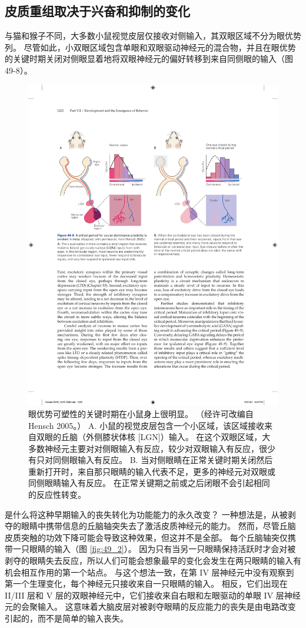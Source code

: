 \subsection{皮质重组取决于兴奋和抑制的变化}

与猫和猴子不同，大多数小鼠视觉皮层仅接收对侧输入，其双眼区域不分为眼优势列。
尽管如此，小双眼区域包含单眼和双眼驱动神经元的混合物，并且在眼优势的关键时期关闭对侧眼显着地将双眼神经元的偏好转移到来自同侧眼的输入（图 49-8）。


\begin{figure}[htbp]
	\centering
	\includegraphics[width=0.9\linewidth]{chap49/fig_49_8}
	\caption{眼优势可塑性的关键时期在小鼠身上很明显。 （经许可改编自 Hensch 2005。） A. 小鼠的视觉皮层包含一个小区域，该区域接收来自双眼的丘脑（外侧膝状体核 [LGN]）输入。 在这个双眼区域，大多数神经元主要对对侧眼输入有反应，较少对双眼输入有反应，很少有只对同侧眼输入有反应。 B. 当对侧眼睛在正常关键时期关闭然后重新打开时，来自那只眼睛的输入代表不足，更多的神经元对双眼或同侧眼睛输入有反应。 在正常关键期之前或之后闭眼不会引起相同的反应性转变。}
	\label{fig:49_8}
\end{figure}


是什么将这种早期输入的丧失转化为功能能力的永久改变？
一种想法是，从被剥夺的眼睛中携带信息的丘脑轴突失去了激活皮质神经元的能力。
然而，尽管丘脑皮质突触的功效下降可能会导致这种效果，但这并不是全部。
每个丘脑轴突仅携带一只眼睛的输入（图 \ref{fig:49_2}）。
因为只有当另一只眼睛保持活跃时才会对被剥夺的眼睛失去反应，所以人们可能会想象最早的变化会发生在两只眼睛的输入有机会相互作用的第一个站点。
与这个想法一致，在第 IV 层神经元中没有观察到第一个生理变化，每个神经元只接收来自一只眼睛的输入。
相反，它们出现在 II/III 层和 V 层的双眼神经元中，它们接收来自右眼和左眼驱动的单眼 IV 层神经元的会聚输入。
这意味着大脑皮层对被剥夺眼睛的反应能力的丧失是由电路改变引起的，而不是简单的输入丧失。


